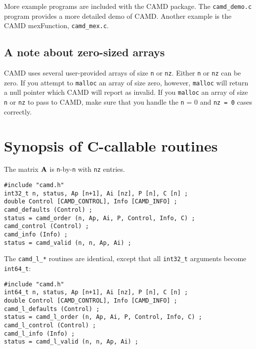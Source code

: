 \documentclass[11pt]{article}
\newcommand{\m}[1]{{\bf{#1}}}       %
\begin{document}
More example programs are included with the CAMD package.
The {\tt camd\_demo.c} program provides a more detailed demo of CAMD.
Another example is the CAMD mexFunction, {\tt camd\_mex.c}.

\subsection{A note about zero-sized arrays}

CAMD uses several user-provided arrays of size {\tt n} or {\tt nz}.
Either {\tt n} or {\tt nz} can be zero.
If you attempt to {\tt malloc} an array of size zero,
however, {\tt malloc} will return a null pointer which CAMD will report
as invalid.  If you {\tt malloc} an array of
size {\tt n} or {\tt nz} to pass to CAMD, make sure that you handle the
{\tt n} = 0 and {\tt nz = 0} cases correctly.

\section{Synopsis of C-callable routines}
\label{Synopsis}

The matrix $\m{A}$ is {\tt n}-by-{\tt n} with {\tt nz} entries.

{\footnotesize
\begin{verbatim}
#include "camd.h"
int32_t n, status, Ap [n+1], Ai [nz], P [n], C [n] ;
double Control [CAMD_CONTROL], Info [CAMD_INFO] ;
camd_defaults (Control) ;
status = camd_order (n, Ap, Ai, P, Control, Info, C) ;
camd_control (Control) ;
camd_info (Info) ;
status = camd_valid (n, n, Ap, Ai) ;
\end{verbatim}
}

The {\tt camd\_l\_*} routines are identical, except that all \verb'int32_t'
arguments become \verb'int64_t':

{\footnotesize
\begin{verbatim}
#include "camd.h"
int64_t n, status, Ap [n+1], Ai [nz], P [n], C [n] ;
double Control [CAMD_CONTROL], Info [CAMD_INFO] ;
camd_l_defaults (Control) ;
status = camd_l_order (n, Ap, Ai, P, Control, Info, C) ;
camd_l_control (Control) ;
camd_l_info (Info) ;
status = camd_l_valid (n, n, Ap, Ai) ;
\end{verbatim}
}
\end{document}
